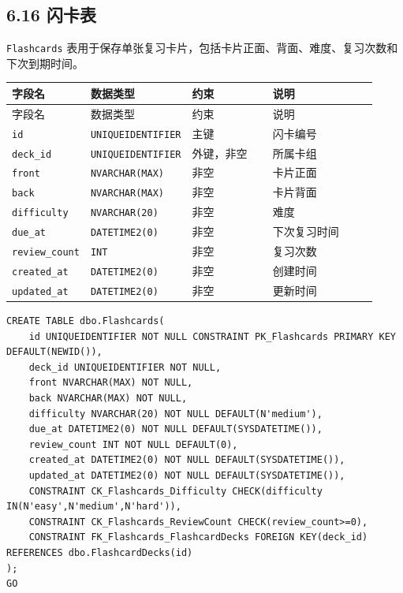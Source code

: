 \documentclass[10pt,a4paper,fontset=none]{ctexart}
\begin{document}
\subsection*{6.16 闪卡表}

\texttt{Flashcards} 表用于保存单张复习卡片，包括卡片正面、背面、难度、复习次数和下次到期时间。\par

\begingroup\scriptsize
\renewcommand{\arraystretch}{1.18}
\setlength{\LTleft}{0pt}
\setlength{\LTright}{0pt}
\begin{longtable}{>{\raggedright\arraybackslash}p{0.20\linewidth}>{\raggedright\arraybackslash}p{0.16\linewidth}>{\raggedright\arraybackslash}p{0.24\linewidth}>{\raggedright\arraybackslash}p{0.32\linewidth}}
\toprule
字段名 & 数据类型 & 约束 & 说明 \\
\midrule
\endfirsthead
\toprule
字段名 & 数据类型 & 约束 & 说明 \\
\midrule
\endhead
\texttt{id} & \texttt{UNIQUEIDENTIFIER} & 主键 & 闪卡编号 \\
\texttt{deck\_id} & \texttt{UNIQUEIDENTIFIER} & 外键，非空 & 所属卡组 \\
\texttt{front} & \texttt{NVARCHAR(MAX)} & 非空 & 卡片正面 \\
\texttt{back} & \texttt{NVARCHAR(MAX)} & 非空 & 卡片背面 \\
\texttt{difficulty} & \texttt{NVARCHAR(20)} & 非空 & 难度 \\
\texttt{due\_at} & \texttt{DATETIME2(0)} & 非空 & 下次复习时间 \\
\texttt{review\_count} & \texttt{INT} & 非空 & 复习次数 \\
\texttt{created\_at} & \texttt{DATETIME2(0)} & 非空 & 创建时间 \\
\texttt{updated\_at} & \texttt{DATETIME2(0)} & 非空 & 更新时间 \\
\bottomrule
\end{longtable}
\endgroup


\begin{Verbatim}[fontsize=\scriptsize,frame=single]
CREATE TABLE dbo.Flashcards(
    id UNIQUEIDENTIFIER NOT NULL CONSTRAINT PK_Flashcards PRIMARY KEY DEFAULT(NEWID()),
    deck_id UNIQUEIDENTIFIER NOT NULL,
    front NVARCHAR(MAX) NOT NULL,
    back NVARCHAR(MAX) NOT NULL,
    difficulty NVARCHAR(20) NOT NULL DEFAULT(N'medium'),
    due_at DATETIME2(0) NOT NULL DEFAULT(SYSDATETIME()),
    review_count INT NOT NULL DEFAULT(0),
    created_at DATETIME2(0) NOT NULL DEFAULT(SYSDATETIME()),
    updated_at DATETIME2(0) NOT NULL DEFAULT(SYSDATETIME()),
    CONSTRAINT CK_Flashcards_Difficulty CHECK(difficulty IN(N'easy',N'medium',N'hard')),
    CONSTRAINT CK_Flashcards_ReviewCount CHECK(review_count>=0),
    CONSTRAINT FK_Flashcards_FlashcardDecks FOREIGN KEY(deck_id) REFERENCES dbo.FlashcardDecks(id)
);
GO
\end{Verbatim}
\end{document}
